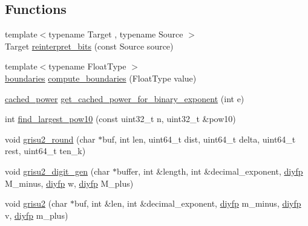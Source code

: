 \subsection*{Functions}
\begin{DoxyCompactItemize}
\item 
{\footnotesize template$<$typename Target , typename Source $>$ }\\Target \hyperlink{namespacenlohmann_1_1detail_1_1dtoa__impl_a1c5d30eb51e5e994a3f48bde104d2ce8}{reinterpret\+\_\+bits} (const Source source)
\item 
{\footnotesize template$<$typename Float\+Type $>$ }\\\hyperlink{structnlohmann_1_1detail_1_1dtoa__impl_1_1boundaries}{boundaries} \hyperlink{namespacenlohmann_1_1detail_1_1dtoa__impl_a22b6e37654ac93c6d0d9c06ec1bf5ded}{compute\+\_\+boundaries} (Float\+Type value)
\item 
\hyperlink{structnlohmann_1_1detail_1_1dtoa__impl_1_1cached__power}{cached\+\_\+power} \hyperlink{namespacenlohmann_1_1detail_1_1dtoa__impl_adbf329a18c5cf854a3477327afd2200b}{get\+\_\+cached\+\_\+power\+\_\+for\+\_\+binary\+\_\+exponent} (int e)
\item 
int \hyperlink{namespacenlohmann_1_1detail_1_1dtoa__impl_a264df2b5a7e19b864859161f3501155e}{find\+\_\+largest\+\_\+pow10} (const uint32\+\_\+t n, uint32\+\_\+t \&pow10)
\item 
void \hyperlink{namespacenlohmann_1_1detail_1_1dtoa__impl_a9e66e6d0f072aa4fc0627bffc5b1cbd8}{grisu2\+\_\+round} (char $\ast$buf, int len, uint64\+\_\+t dist, uint64\+\_\+t delta, uint64\+\_\+t rest, uint64\+\_\+t ten\+\_\+k)
\item 
void \hyperlink{namespacenlohmann_1_1detail_1_1dtoa__impl_a9b899c72b0e1e3dd46d75c2b4e6bcdfb}{grisu2\+\_\+digit\+\_\+gen} (char $\ast$buffer, int \&length, int \&decimal\+\_\+exponent, \hyperlink{structnlohmann_1_1detail_1_1dtoa__impl_1_1diyfp}{diyfp} M\+\_\+minus, \hyperlink{structnlohmann_1_1detail_1_1dtoa__impl_1_1diyfp}{diyfp} w, \hyperlink{structnlohmann_1_1detail_1_1dtoa__impl_1_1diyfp}{diyfp} M\+\_\+plus)
\item 
void \hyperlink{namespacenlohmann_1_1detail_1_1dtoa__impl_a05b681dcb8569b9784c6dccfadb01633}{grisu2} (char $\ast$buf, int \&len, int \&decimal\+\_\+exponent, \hyperlink{structnlohmann_1_1detail_1_1dtoa__impl_1_1diyfp}{diyfp} m\+\_\+minus, \hyperlink{structnlohmann_1_1detail_1_1dtoa__impl_1_1diyfp}{diyfp} v, \hyperlink{structnlohmann_1_1detail_1_1dtoa__impl_1_1diyfp}{diyfp} m\+\_\+plus)
\item 

\end{DoxyCompactItemize}
